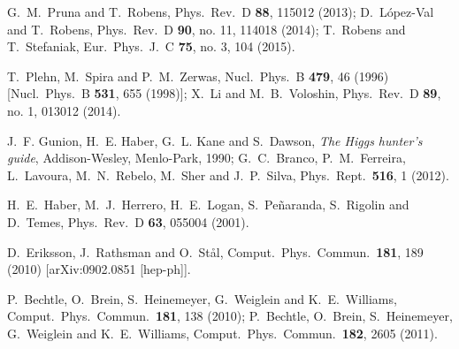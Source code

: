   G.~M.~Pruna and T.~Robens,
  Phys.\ Rev.\ D {\bf 88}, 115012 (2013);
  D.~L\'opez-Val and T.~Robens,
  Phys.\ Rev.\ D {\bf 90}, no. 11, 114018 (2014);  
  T.~Robens and T.~Stefaniak,
  Eur.\ Phys.\ J.\ C {\bf 75}, no. 3, 104 (2015).

  T.~Plehn, M.~Spira and P.~M.~Zerwas,
  Nucl.\ Phys.\ B {\bf 479}, 46 (1996)
  [Nucl.\ Phys.\ B {\bf 531}, 655 (1998)];
  X.~Li and M.~B.~Voloshin,
  Phys.\ Rev.\ D {\bf 89}, no. 1, 013012 (2014).

  J.~F. Gunion, H.~E. Haber, G.~L. Kane and S.~Dawson,
  \textsl{The {H}iggs hunter's guide},
  Addison-Wesley, Menlo-Park, 1990;
  G.~C.~Branco, P.~M.~Ferreira, L.~Lavoura, M.~N.~Rebelo, M.~Sher and J.~P.~Silva,
  Phys.\ Rept.\  {\bf 516}, 1 (2012).

  H.~E.~Haber, M.~J.~Herrero, H.~E.~Logan, S.~Pe\~naranda, S.~Rigolin and D.~Temes,
  Phys.\ Rev.\ D {\bf 63}, 055004 (2001).

  D.~Eriksson, J.~Rathsman and O.~St{\aa}l,
  Comput.\ Phys.\ Commun.\  {\bf 181}, 189 (2010)
  [arXiv:0902.0851 [hep-ph]].

  P.~Bechtle, O.~Brein, S.~Heinemeyer, G.~Weiglein and K.~E.~Williams,
  Comput.\ Phys.\ Commun.\  {\bf 181}, 138 (2010);
  P.~Bechtle, O.~Brein, S.~Heinemeyer, G.~Weiglein and K.~E.~Williams,
  Comput.\ Phys.\ Commun.\  {\bf 182}, 2605 (2011).

